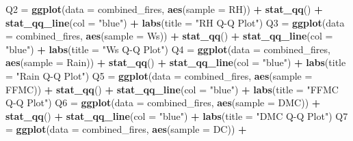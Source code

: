 \documentclass[
]{article}
\newenvironment{Shaded}{\begin{snugshade}}{\end{snugshade}}
\newcommand{\AttributeTok}[1]{\textcolor[rgb]{0.13,0.29,0.53}{#1}}
\newcommand{\FunctionTok}[1]{\textcolor[rgb]{0.13,0.29,0.53}{\textbf{#1}}}
\newcommand{\NormalTok}[1]{#1}
\newcommand{\OtherTok}[1]{\textcolor[rgb]{0.56,0.35,0.01}{#1}}
\newcommand{\SpecialCharTok}[1]{\textcolor[rgb]{0.81,0.36,0.00}{\textbf{#1}}}
\newcommand{\StringTok}[1]{\textcolor[rgb]{0.31,0.60,0.02}{#1}}
\begin{document}
\begin{Shaded}
\begin{Highlighting}[]
\NormalTok{Q2 }\OtherTok{=} \FunctionTok{ggplot}\NormalTok{(}\AttributeTok{data =}\NormalTok{ combined\_fires, }\FunctionTok{aes}\NormalTok{(}\AttributeTok{sample =}\NormalTok{ RH)) }\SpecialCharTok{+}
  \FunctionTok{stat\_qq}\NormalTok{() }\SpecialCharTok{+}
  \FunctionTok{stat\_qq\_line}\NormalTok{(}\AttributeTok{col =} \StringTok{"blue"}\NormalTok{) }\SpecialCharTok{+}
  \FunctionTok{labs}\NormalTok{(}\AttributeTok{title =} \StringTok{"RH Q{-}Q Plot"}\NormalTok{)}
\NormalTok{Q3 }\OtherTok{=} \FunctionTok{ggplot}\NormalTok{(}\AttributeTok{data =}\NormalTok{ combined\_fires, }\FunctionTok{aes}\NormalTok{(}\AttributeTok{sample =}\NormalTok{ Ws)) }\SpecialCharTok{+}
  \FunctionTok{stat\_qq}\NormalTok{() }\SpecialCharTok{+}
  \FunctionTok{stat\_qq\_line}\NormalTok{(}\AttributeTok{col =} \StringTok{"blue"}\NormalTok{) }\SpecialCharTok{+}
  \FunctionTok{labs}\NormalTok{(}\AttributeTok{title =} \StringTok{"Ws Q{-}Q Plot"}\NormalTok{)}
\NormalTok{Q4 }\OtherTok{=} \FunctionTok{ggplot}\NormalTok{(}\AttributeTok{data =}\NormalTok{ combined\_fires, }\FunctionTok{aes}\NormalTok{(}\AttributeTok{sample =}\NormalTok{ Rain)) }\SpecialCharTok{+}
  \FunctionTok{stat\_qq}\NormalTok{() }\SpecialCharTok{+}
  \FunctionTok{stat\_qq\_line}\NormalTok{(}\AttributeTok{col =} \StringTok{"blue"}\NormalTok{) }\SpecialCharTok{+}
  \FunctionTok{labs}\NormalTok{(}\AttributeTok{title =} \StringTok{"Rain Q{-}Q Plot"}\NormalTok{)}
\NormalTok{Q5 }\OtherTok{=} \FunctionTok{ggplot}\NormalTok{(}\AttributeTok{data =}\NormalTok{ combined\_fires, }\FunctionTok{aes}\NormalTok{(}\AttributeTok{sample =}\NormalTok{ FFMC)) }\SpecialCharTok{+}
  \FunctionTok{stat\_qq}\NormalTok{() }\SpecialCharTok{+}
  \FunctionTok{stat\_qq\_line}\NormalTok{(}\AttributeTok{col =} \StringTok{"blue"}\NormalTok{) }\SpecialCharTok{+}
  \FunctionTok{labs}\NormalTok{(}\AttributeTok{title =} \StringTok{"FFMC Q{-}Q Plot"}\NormalTok{)}
\NormalTok{Q6 }\OtherTok{=} \FunctionTok{ggplot}\NormalTok{(}\AttributeTok{data =}\NormalTok{ combined\_fires, }\FunctionTok{aes}\NormalTok{(}\AttributeTok{sample =}\NormalTok{ DMC)) }\SpecialCharTok{+}
  \FunctionTok{stat\_qq}\NormalTok{() }\SpecialCharTok{+}
  \FunctionTok{stat\_qq\_line}\NormalTok{(}\AttributeTok{col =} \StringTok{"blue"}\NormalTok{) }\SpecialCharTok{+}
  \FunctionTok{labs}\NormalTok{(}\AttributeTok{title =} \StringTok{"DMC Q{-}Q Plot"}\NormalTok{)}
\NormalTok{Q7 }\OtherTok{=} \FunctionTok{ggplot}\NormalTok{(}\AttributeTok{data =}\NormalTok{ combined\_fires, }\FunctionTok{aes}\NormalTok{(}\AttributeTok{sample =}\NormalTok{ DC)) }\SpecialCharTok{+}

\end{Highlighting}
\end{Shaded}
\end{document}
